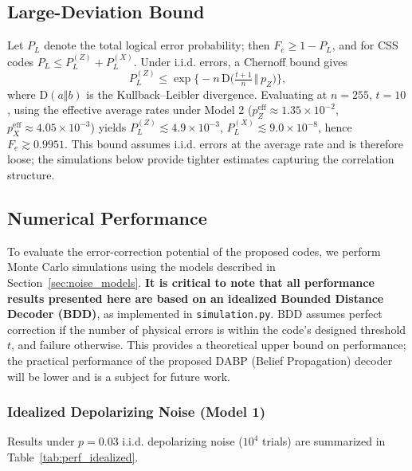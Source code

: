 \documentclass[conference]{IEEEtran}
\newcommand{\KL}{\mathrm{D}}
\begin{document}
\subsection{Large-Deviation Bound}\label{sec:fidelity_bound}
Let \(P_L\) denote the total logical error probability; then \(F_e \ge 1-P_L\), and for CSS codes \(P_L \le P_L^{(Z)}+P_L^{(X)}\). Under i.i.d. errors, a Chernoff bound gives
\begin{equation}
P_L^{(Z)} \le \exp\!\Big\{-n\, \KL\!\Big(\tfrac{t+1}{n}\,\Big\Vert\, p_Z\Big)\Big\},\label{eq:ldp}
\end{equation}
where \(\KL(a\Vert b)\) is the Kullback--Leibler divergence.
Evaluating at \(n=255\), \(t=10\), using the effective average rates under Model 2 (\(p_Z^{\mathrm{eff}}\approx1.35\times10^{-2}\), \(p_X^{\mathrm{eff}}\approx4.05\times10^{-3}\)) yields
\(P_L^{(Z)} \lesssim 4.9\times10^{-3}\), \(P_L^{(X)} \lesssim 9.0\times10^{-8}\), hence \(F_e \gtrsim 0.9951\).
This bound assumes i.i.d. errors at the average rate and is therefore loose; the simulations below provide tighter estimates capturing the correlation structure.

\subsection{Numerical Performance}\label{sec:comparison}

To evaluate the error-correction potential of the proposed codes, we perform Monte Carlo simulations using the models described in Section~\ref{sec:noise_models}. \textbf{It is critical to note that all performance results presented here are based on an idealized Bounded Distance Decoder (BDD)}, as implemented in \texttt{simulation.py}. BDD assumes perfect correction if the number of physical errors is within the code's designed threshold \(t\), and failure otherwise. This provides a theoretical upper bound on performance; the practical performance of the proposed DABP (Belief Propagation) decoder will be lower and is a subject for future work.

\subsubsection{Idealized Depolarizing Noise (Model 1)}
Results under \(p=0.03\) i.i.d. depolarizing noise (\(10^4\) trials) are summarized in Table~\ref{tab:perf_idealized}.
\end{document}
